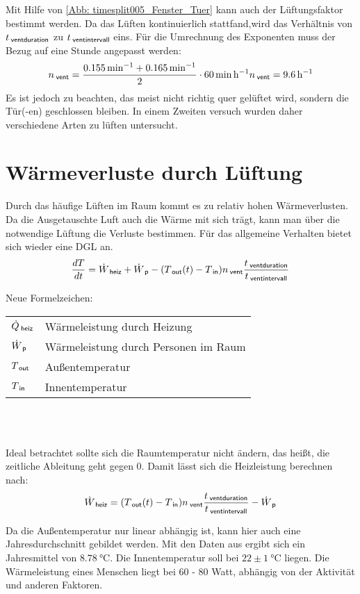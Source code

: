 \documentclass[12pt,a4paper,bibtotocnumbered,liststotocnumbered]{scrreprt}
\newenvironment{parameterNames}{Neue Formelzeichen:\\ \begin{tabular}{ll}}{\end{tabular} \\ \\}
\begin{document}
Mit Hilfe von \autoref{Abb: timesplit005_Fenster_Tuer} kann auch der Lüftungsfaktor bestimmt werden. Da das Lüften kontinuierlich stattfand,wird das Verhältnis von $t_{\: \mathsf{ventduration}}$ zu $t_{\: \mathsf{ventintervall}}$ eins. Für die Umrechnung des Exponenten muss der Bezug auf eine Stunde angepasst werden:
\begin{align}
n_{\: \mathsf{vent}} = \frac{\SI{0.155}{\per\minute} + \SI{0.165}{\per\minute}}{2} \cdot \SI{60}{\minute\per\hour}
n_{\: \mathsf{vent}} = \SI{9.6}{\per\hour}
\end{align}
Es ist jedoch zu beachten, das meist nicht richtig quer gelüftet wird, sondern die Tür(-en) geschlossen bleiben. In einem Zweiten versuch wurden daher verschiedene Arten zu lüften untersucht. \citep[S. 927]{recknagel2009taschenbuch}



\chapter{Wärmeverluste durch Lüftung}
Durch das häufige Lüften im Raum kommt es zu relativ hohen Wärmeverlusten. Da die Ausgetauschte Luft auch die Wärme mit sich trägt, kann man über die notwendige Lüftung die Verluste bestimmen. Für das allgemeine Verhalten bietet sich wieder eine DGL an.
\begin{align}
\frac{dT}{dt} = \dot{W}_{\: \mathsf{heiz}} + \dot{W}_{\: \mathsf{p}} - (T_{\: \mathsf{out}}(t) - T_{\: \mathsf{in}})n_{\: \mathsf{vent}}\frac{t_{\: \mathsf{ventduration}}}{t_{\: \mathsf{ventintervall}}}
\end{align}

\begin{parameterNames}
$\dot{Q}_{\: \mathsf{heiz}}$ & Wärmeleistung durch Heizung\\
$\dot{W}_{\: \mathsf{p}}$ & Wärmeleistung durch Personen im Raum\\
$T_{\: \mathsf{out}}$ & Außentemperatur\\
$T_{\: \mathsf{in}}$ & Innentemperatur
\end{parameterNames}

Ideal betrachtet sollte sich die Raumtemperatur nicht ändern, das heißt, die zeitliche Ableitung geht gegen 0. Damit lässt sich die Heizleistung berechnen nach:
\begin{align}
\dot{W}_{\: \mathsf{heiz}} =(T_{\: \mathsf{out}}(t) - T_{\: \mathsf{in}}) n_{\: \mathsf{vent}} \frac{t_{\: \mathsf{ventduration}}}{t_{\: \mathsf{ventintervall}}} -  \dot{W}_{\: \mathsf{p}}
\end{align} 

Da die Außentemperatur nur linear abhängig ist, kann hier auch eine Jahresdurchschnitt gebildet werden. Mit den Daten aus \cite{DWD_MD} ergibt sich ein Jahresmittel von $\SI{8.78}{\celsius}$. Die Innentemperatur soll bei $22\pm \SI{1}{\celsius}$ \cite[S. 109]{recknagel2009taschenbuch} liegen. Die Wärmeleistung eines Menschen liegt bei 60 - 80 Watt, abhängig von der Aktivität und anderen Faktoren.



\newpage
\RaggedRight



\listoffigures

\listoftables
\end{document}
